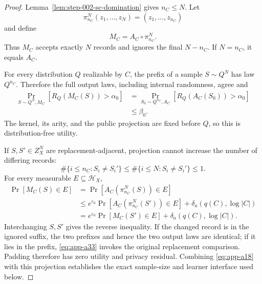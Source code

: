 \begin{proof}
Lemma~\ref{lem:step-002-sc-domination} gives \(n_C\leq N\).  Let
\begin{equation}
\pi_{n_C}^N(z_1,\ldots,z_N)=(z_1,\ldots,z_{n_C})
\label{eq:app-a30}
\end{equation}
and define
\begin{equation}
M_C=A_C\circ\pi_{n_C}^N.
\label{eq:app-a31}
\end{equation}
Thus \(M_C\) accepts exactly \(N\) records and ignores the final
\(N-n_C\).  If \(N=n_C\), it equals \(A_C\).

For every distribution \(Q\) realizable by \(C\), the prefix of a
sample \(S\sim Q^N\) has law \(Q^{n_C}\).  Therefore the full output
laws, including internal randomness, agree and
\begin{equation}
\begin{aligned}
\Pr_{S\sim Q^N,M_C}[R_Q(M_C(S))>\alpha_0]
&=
\Pr_{S_0\sim Q^{n_C},A_C}
[R_Q(A_C(S_0))>\alpha_0]\\
&\leq\beta_0.
\end{aligned}
\label{eq:app-a32}
\end{equation}
The kernel, its arity, and the public projection are fixed before
\(Q\), so this is distribution-free utility.

If \(S,S'\in Z_X^N\) are replacement-adjacent, projection cannot
increase the number of differing records:
\begin{equation}
\#\{i\leq n_C:S_i\neq S_i'\}
\leq
\#\{i\leq N:S_i\neq S_i'\}
\leq1.
\label{eq:app-a33}
\end{equation}
For every measurable \(E\subseteq\mathcal H_X\),
\begin{equation}
\begin{aligned}
\Pr[M_C(S)\in E]
&=\Pr[A_C(\pi_{n_C}^N(S))\in E]\\
&\leq e^{\varepsilon_0}
\Pr[A_C(\pi_{n_C}^N(S'))\in E]
+\delta_a(q(C),\log|C|)\\
&=e^{\varepsilon_0}\Pr[M_C(S')\in E]
+\delta_a(q(C),\log|C|).
\end{aligned}
\label{eq:app-a34}
\end{equation}
Interchanging \(S,S'\) gives the reverse inequality.  If the changed
record is in the ignored suffix, the two prefixes and hence the two
output laws are identical; if it lies in the prefix, \eqref{eq:app-a33} invokes
the original replacement comparison.  Padding therefore has zero
utility and privacy residual.  Combining \eqref{eq:app-a18} with this projection
establishes the exact sample-size and learner interface used below.
\end{proof}

